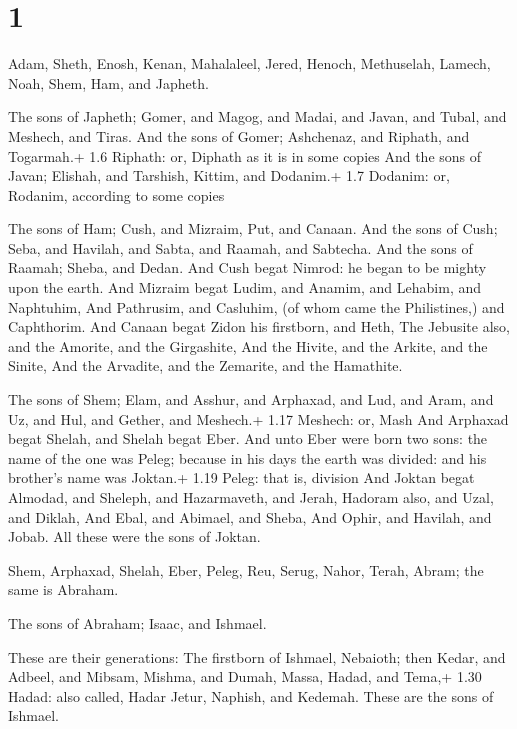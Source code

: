 \hypertarget{section}{%
\section{1}\label{section}}

 Adam, Sheth, Enosh,  Kenan, Mahalaleel, Jered,
 Henoch, Methuselah, Lamech,  Noah, Shem, Ham,
and Japheth.

 The sons of Japheth; Gomer, and Magog, and Madai, and
Javan, and Tubal, and Meshech, and Tiras.  And the sons of
Gomer; Ashchenaz, and Riphath, and Togarmah.+ 1.6 Riphath: or, Diphath
as it is in some copies  And the sons of Javan; Elishah, and
Tarshish, Kittim, and Dodanim.+ 1.7 Dodanim: or, Rodanim, according to
some copies

 The sons of Ham; Cush, and Mizraim, Put, and Canaan.
 And the sons of Cush; Seba, and Havilah, and Sabta, and
Raamah, and Sabtecha. And the sons of Raamah; Sheba, and Dedan.
 And Cush begat Nimrod: he began to be mighty upon the
earth.  And Mizraim begat Ludim, and Anamim, and Lehabim,
and Naphtuhim,  And Pathrusim, and Casluhim, (of whom came
the Philistines,) and Caphthorim.  And Canaan begat Zidon
his firstborn, and Heth,  The Jebusite also, and the
Amorite, and the Girgashite,  And the Hivite, and the
Arkite, and the Sinite,  And the Arvadite, and the
Zemarite, and the Hamathite.

 The sons of Shem; Elam, and Asshur, and Arphaxad, and
Lud, and Aram, and Uz, and Hul, and Gether, and Meshech.+ 1.17 Meshech:
or, Mash  And Arphaxad begat Shelah, and Shelah begat Eber.
 And unto Eber were born two sons: the name of the one was
Peleg; because in his days the earth was divided: and his brother's name
was Joktan.+ 1.19 Peleg: that is, division  And Joktan
begat Almodad, and Sheleph, and Hazarmaveth, and Jerah, 
Hadoram also, and Uzal, and Diklah,  And Ebal, and Abimael,
and Sheba,  And Ophir, and Havilah, and Jobab. All these
were the sons of Joktan.

 Shem, Arphaxad, Shelah,  Eber, Peleg, Reu,
 Serug, Nahor, Terah,  Abram; the same is
Abraham.

 The sons of Abraham; Isaac, and Ishmael.

 These are their generations: The firstborn of Ishmael,
Nebaioth; then Kedar, and Adbeel, and Mibsam,  Mishma, and
Dumah, Massa, Hadad, and Tema,+ 1.30 Hadad: also called, Hadar
 Jetur, Naphish, and Kedemah. These are the sons of
Ishmael.

